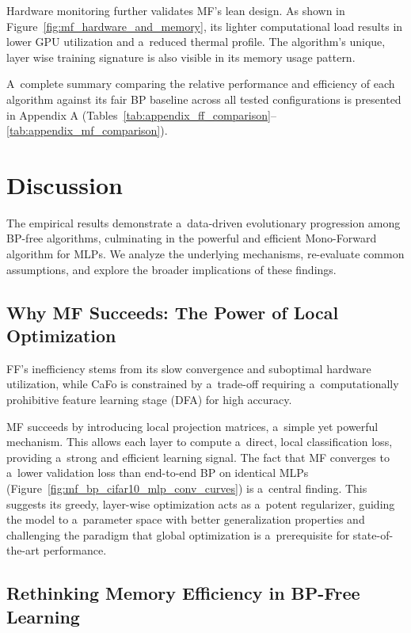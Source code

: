 \documentclass[letterpaper]{article}
\begin{document}
Hardware monitoring further validates MF's lean design. As shown in Figure~\ref{fig:mf_hardware_and_memory}, its lighter computational load results in lower GPU utilization and a~reduced thermal profile. The algorithm's unique, layer wise training signature is also visible in its memory usage pattern.

A~complete summary comparing the relative performance and efficiency of each algorithm against its fair BP baseline across all tested configurations is presented in Appendix A (Tables~\ref{tab:appendix_ff_comparison}--\ref{tab:appendix_mf_comparison}).

\section{Discussion}

The empirical results demonstrate a~data-driven evolutionary progression among BP-free algorithms, culminating in the powerful and efficient Mono-Forward algorithm for MLPs. We analyze the underlying mechanisms, re-evaluate common assumptions, and explore the broader implications of these findings.

\subsection{Why MF Succeeds: The Power of Local Optimization}

FF's inefficiency stems from its slow convergence and suboptimal hardware utilization, while CaFo is constrained by a~trade-off requiring a~computationally prohibitive feature learning stage (DFA) for high accuracy.

MF succeeds by introducing local projection matrices, a~simple yet powerful mechanism. This allows each layer to compute a~direct, local classification loss, providing a~strong and efficient learning signal. The fact that MF converges to a~lower validation loss than end-to-end BP on identical MLPs (Figure~\ref{fig:mf_bp_cifar10_mlp_conv_curves}) is a~central finding. This suggests its greedy, layer-wise optimization acts as a~potent regularizer, guiding the model to a~parameter space with better generalization properties and challenging the paradigm that global optimization is a~prerequisite for state-of-the-art performance.

\subsection{Rethinking Memory Efficiency in BP-Free Learning}
\end{document}
